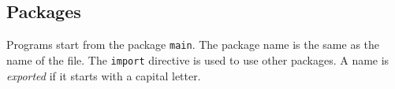 \subsection{Packages}
Programs start from the package \texttt{main}. The package name is the same as the name of the file. The \texttt{import} directive is used to use other packages. A name is \textit{exported} if it starts with a capital letter.


